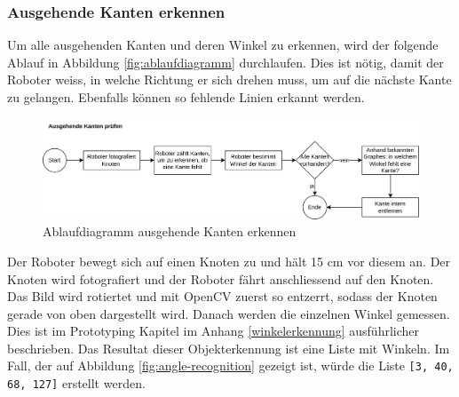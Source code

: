 \subsubsection{Ausgehende Kanten erkennen}\label{outgoing-angles}

Um alle ausgehenden Kanten und deren Winkel zu erkennen, wird der folgende Ablauf in Abbildung \ref{fig:ablaufdiagramm} durchlaufen. Dies ist nötig, damit der Roboter weiss, in welche Richtung er sich drehen muss, um auf die nächste Kante zu gelangen. Ebenfalls können so fehlende Linien erkannt werden.

\begin{figure}[H]
\centering
\includegraphics[width=\textwidth]{assets/gesamtkonzept/ablaufdiagramm-kanten-erkennen.png}
\caption{Ablaufdiagramm ausgehende Kanten erkennen}
\label{fig:ablaufdiagramm-kanten-erkennen}
\end{figure}

Der Roboter bewegt sich auf einen Knoten zu und hält 15 cm vor diesem an. Der Knoten wird fotografiert und der Roboter fährt anschliessend auf den Knoten. Das Bild wird rotiertet und mit OpenCV zuerst so entzerrt, sodass der Knoten gerade von oben dargestellt wird. Danach werden die einzelnen Winkel gemessen. Dies ist im Prototyping Kapitel im Anhang \ref{winkelerkennung} ausführlicher beschrieben. Das Resultat dieser Objekterkennung ist eine Liste mit Winkeln. Im Fall, der auf Abbildung \ref{fig:angle-recognition} gezeigt ist, würde die Liste \verb|[3, 40, 68, 127]| erstellt werden.

